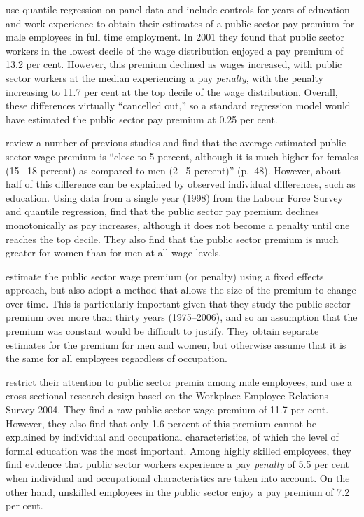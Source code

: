 \documentclass[a4paper,11pt,titlepage]{article}
\begin{document}
\citet{Yu2005} use quantile regression on panel data and include controls for years of education and work experience to obtain their estimates of a public sector pay premium for male employees in full time employment.  In 2001 they found that public sector workers in the lowest decile of the wage distribution enjoyed a pay premium of 13.2 per cent.  However, this premium declined as wages increased, with public sector workers at the median experiencing a pay \emph{penalty}, with the penalty increasing to 11.7 per cent at the top decile of the wage distribution.  Overall, these differences virtually ``cancelled out,'' so a standard regression model would have estimated the public sector pay premium at 0.25 per cent.

\citet{Luciflora2006} review a number of previous studies and find that the average estimated public sector wage premium is ``close to 5 percent, although  it  is  much  higher  for  females  (15–-18  percent)  as  compared  to
men (2-–5 percent)'' (p.~48).  However, about half of this difference can be explained by observed individual differences, such as education.   Using data from a single year (1998) from the Labour Force Survey and quantile regression, \citet{Luciflora2006} find that the public sector pay premium declines monotonically as pay increases, although it does not become a penalty until one reaches the top decile.  They also find that the public sector premium is much greater for women than for men at all wage levels.

\citet{Disney2008} estimate the public sector wage premium (or penalty) using a fixed effects approach, but also adopt a method that allows the size of the premium to change over time.  This is particularly important given that they study the public sector premium over more than thirty years (1975--2006), and so an assumption that the premium was constant would be difficult to justify.  They obtain separate estimates for the premium for men and women, but otherwise assume that it is the same for all employees regardless of occupation.

\citet{Chatterji2007} restrict their attention to public sector premia among male employees, and use a cross-sectional research design based on the Workplace Employee Relations Survey 2004.  They find a raw public sector wage premium of 11.7 per cent.  However, they also find that only 1.6 percent of this premium cannot be explained by individual and occupational characteristics, of which the level of formal education was the most important. Among highly skilled employees, they find evidence that public sector workers experience a pay \emph{penalty} of 5.5 per cent when individual and occupational characteristics are taken into account.  On the other hand, unskilled employees in the public sector enjoy a pay premium of 7.2 per cent.
\end{document}
